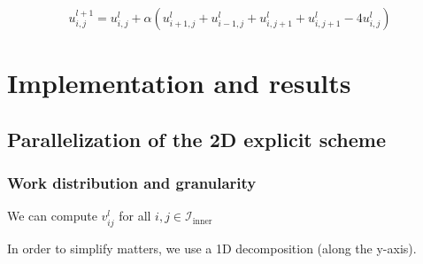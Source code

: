 \documentclass[10pt,a4paper]{article}
\newcommand{\indicesetinner}{\mathcal{I}_{\mathrm{inner}}}
\begin{document}
\begin{equation}
u_{i,j}^{l+1} = u_{i,j}^l + \alpha\left( u_{i+1,j}^l + u_{i-1,j}^l + u_{i,j+1}^l + u_{i,j+1}^l - 4u_{i,j}^l \right)
\end{equation}



\section{Implementation and results}\label{sec:implementation_and_results}

\subsection{Parallelization of the 2D explicit scheme}
\subsubsection{Work distribution and granularity}
\cite{inf3380_bok}
We can compute $v_{ij}^l$ for all $i, j \in \indicesetinner$

In order to simplify matters, we use a 1D decomposition (along the y-axis).



{}
\end{document}
